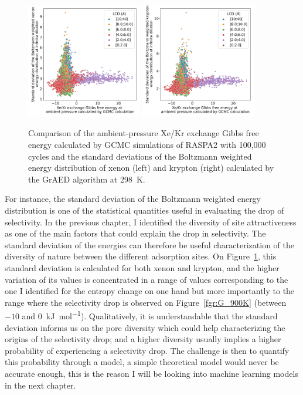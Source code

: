 \documentclass[main]{subfiles}
\begin{document}
\begin{figure}[ht]
  \centering
    \includegraphics[width=0.45\textwidth]{figures/3-fastsim/G_2080_vs_enthalpy_std_x_overview.jpg}
    \includegraphics[width=0.45\textwidth]{figures/3-fastsim/G_2080_vs_enthalpy_std_y_overview.jpg}
        \caption{Comparison of the ambient-pressure Xe/Kr exchange Gibbs free energy calculated by GCMC simulations of RASPA2 with 100,000 cycles and the standard deviations of the Boltzmann weighted energy distribution of xenon (left) and krypton (right) calculated by the GrAED algorithm at \SI{298}{\kelvin}.}\label{fgr:enthalpy_std}
\end{figure}

For instance, the standard deviation of the Boltzmann weighted energy distribution is one of the statistical quantities useful in evaluating the drop of selectivity. In the previous chapter, I identified the diversity of site attractiveness as one of the main factors that could explain the drop in selectivity. The standard deviation of the energies can therefore be useful characterization of the diversity of nature between the different adsorption sites. On Figure~\ref{fgr:enthalpy_std}, this standard deviation is calculated for both xenon and krypton, and the higher variation of its values is concentrated in a range of values corresponding to the one I identified for the entropy change on one hand but more importantly to the range where the selectivity drop is observed on Figure~\ref{fgr:G_900K} (between $-10$ and $0$~\si{\kilo\joule\per\mole}). Qualitatively, it is understandable that the standard deviation informs us on the pore diversity which could help characterizing the origins of the selectivity drop; and a higher diversity usually implies a higher probability of experiencing a selectivity drop. The challenge is then to quantify this probability through a model, a simple theoretical model would never be accurate enough, this is the reason I will be looking into machine learning models in the next chapter.
\end{document}
